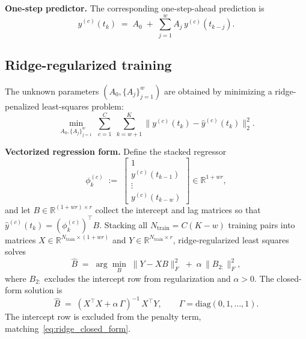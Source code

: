 \noindent\textbf{One-step predictor.}
The corresponding one-step-ahead prediction is
\begin{equation}\label{eq:mvar_predictor}
  \hat y^{(c)}(t_k) \;=\; A_0 \;+\;
  \sum_{j=1}^{w} A_j\,y^{(c)}(t_{k-j}).
\end{equation}

\subsection{Ridge-regularized training}\label{subsec:mvar_training}
The unknown parameters $(A_0,\{A_j\}_{j=1}^w)$ are obtained by minimizing a ridge-penalized least-squares problem:
\begin{equation}\label{eq:mvar_ls_problem}
  \min_{A_0,\{A_j\}_{j=1}^w}\;
  \sum_{c=1}^{C}\;\sum_{k=w+1}^{K}
  \bigl\|y^{(c)}(t_k)-\hat y^{(c)}(t_k)\bigr\|_2^2.
\end{equation}

\noindent\textbf{Vectorized regression form.}
Define the stacked regressor
\[
  \phi^{(c)}_k \;:=\;
  \begin{bmatrix}1\\[2pt] y^{(c)}(t_{k-1})\\ \vdots\\ y^{(c)}(t_{k-w})\end{bmatrix}
  \!\in\mathbb{R}^{1+wr},
\]
and let
$B\in\mathbb{R}^{(1+wr)\times r}$ collect the intercept and lag matrices
so that $\hat y^{(c)}(t_k) = (\phi^{(c)}_k)^\top B$.
Stacking all $N_{\mathrm{train}}=C(K-w)$ training pairs into matrices
$X\in\mathbb{R}^{N_{\mathrm{train}}\times(1+wr)}$ and
$Y\in\mathbb{R}^{N_{\mathrm{train}}\times r}$,
ridge-regularized least squares solves
\begin{equation}\label{eq:mvar_ridge}
  \hat B \;=\; \arg\min_{B}\;\|Y - XB\|_F^2
             \;+\;\alpha\,\|B_{2:}\|_F^2,
\end{equation}
where $B_{2:}$ excludes the intercept row from regularization and
$\alpha>0$.
The closed-form solution is
\begin{equation}\label{eq:ridge_closed_form}
  \hat B \;=\; (X^\top X + \alpha\,\Gamma)^{-1}\,X^\top Y,
  \qquad
  \Gamma = \mathrm{diag}(0,1,\dots,1).
\end{equation}
The intercept row is excluded from the penalty term,
matching~\eqref{eq:ridge_closed_form}.

